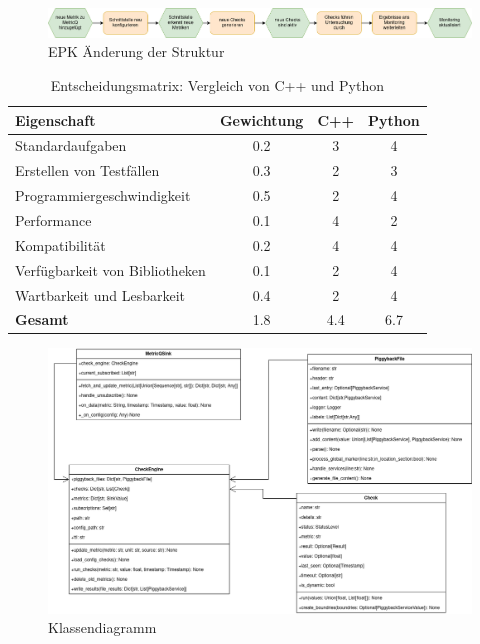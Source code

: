 \begin{figure}[H]
  \centering
  \includegraphics[width=\textwidth]{images/epk-structure-change.png}
  \caption{EPK Änderung der Struktur}
  \label{fig:epk-structure-changes}
\end{figure}

\begin{table}[H]
  \centering
  \begin{tabular}{l c c c}
    \hline
    \textbf{Eigenschaft} & \textbf{Gewichtung} & \textbf{C++} & \textbf{Python}\\
    \hline
    Standardaufgaben                    & 0.2   & 3   & 4 \\
    Erstellen von Testfällen            & 0.3   & 2   & 3 \\
    Programmiergeschwindigkeit          & 0.5   & 2   & 4 \\
    Performance                         & 0.1   & 4   & 2 \\
    Kompatibilität                      & 0.2   & 4   & 4 \\
    Verfügbarkeit von Bibliotheken      & 0.1   & 2   & 4 \\
    Wartbarkeit und Lesbarkeit          & 0.4   & 2   & 4 \\
    \hline
    \textbf{Gesamt}                     & 1.8   & 4.4 & 6.7 \\
    \hline
  \end{tabular}
  \caption{Entscheidungsmatrix: Vergleich von C++ und Python}
  \label{tab:entscheidungsmatrix}
\end{table}

\begin{figure}[H]
  \centering
  \includegraphics[width=\textwidth]{images/class-diagram.png}
  \caption{Klassendiagramm}
  \label{fig:class-diagram}
\end{figure}

